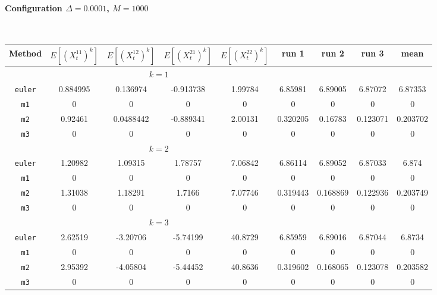 \paragraph*{Configuration $\Delta=0.0001$, $M=1000$}\hfill\\
\begin{tabular}{@{}*{9}{c}@{}}
Method & $E[(X^{11}_t)^k]$ & $E[(X^{12}_t)^k]$ & $E[(X^{21}_t)^k]$ & $E[(X^{22}_t)^k]$ & run 1 & run 2 & run 3 & mean\\
\hline
\multicolumn{6}{c}{$k=1$}\\
\verb+euler+ & 0.884995 & 0.136974 & -0.913738 & 1.99784 & 6.85981 & 6.89005 & 6.87072 & 6.87353 \\
 \verb+m1+ & 0 & 0 & 0 & 0 & 0 & 0 & 0 & 0 \\
 \verb+m2+ & 0.92461 & 0.0488442 & -0.889341 & 2.00131 & 0.320205 & 0.16783 & 0.123071 & 0.203702 \\
 \verb+m3+ & 0 & 0 & 0 & 0 & 0 & 0 & 0 & 0 \\
\hline
\multicolumn{6}{c}{$k=2$}\\
\verb+euler+ & 1.20982 & 1.09315 & 1.78757 & 7.06842 & 6.86114 & 6.89052 & 6.87033 & 6.874 \\
 \verb+m1+ & 0 & 0 & 0 & 0 & 0 & 0 & 0 & 0 \\
 \verb+m2+ & 1.31038 & 1.18291 & 1.7166 & 7.07746 & 0.319443 & 0.168869 & 0.122936 & 0.203749 \\
 \verb+m3+ & 0 & 0 & 0 & 0 & 0 & 0 & 0 & 0 \\
\hline
\multicolumn{6}{c}{$k=3$}\\
\verb+euler+ & 2.62519 & -3.20706 & -5.74199 & 40.8729 & 6.85959 & 6.89016 & 6.87044 & 6.8734 \\
 \verb+m1+ & 0 & 0 & 0 & 0 & 0 & 0 & 0 & 0 \\
 \verb+m2+ & 2.95392 & -4.05804 & -5.44452 & 40.8636 & 0.319602 & 0.168065 & 0.123078 & 0.203582 \\
 \verb+m3+ & 0 & 0 & 0 & 0 & 0 & 0 & 0 & 0 
\end{tabular}\hfill\\
